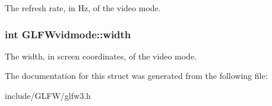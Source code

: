 \-The refresh rate, in \-Hz, of the video mode. \hypertarget{structGLFWvidmode_a698dcb200562051a7249cb6ae154c71d}{
\subsubsection[{width}]{\setlength{\rightskip}{0pt plus 5cm}int {\bf \-G\-L\-F\-Wvidmode\-::width}}}\label{structGLFWvidmode_a698dcb200562051a7249cb6ae154c71d}
\-The width, in screen coordinates, of the video mode. 

\-The documentation for this struct was generated from the following file\-:\begin{DoxyCompactItemize}
\item 
include/\-G\-L\-F\-W/glfw3.\-h\end{DoxyCompactItemize}
